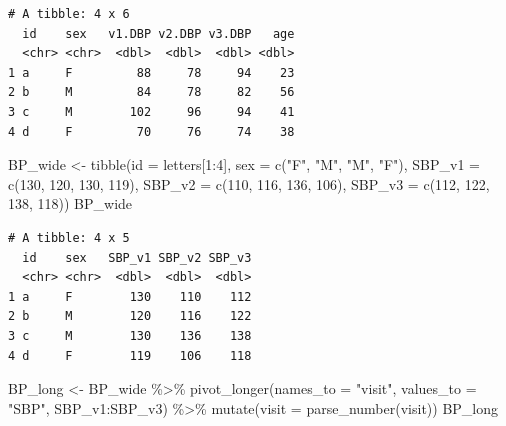 \documentclass[
]{book}
\newenvironment{Shaded}{\begin{snugshade}}{\end{snugshade}}
\newcommand{\AttributeTok}[1]{\textcolor[rgb]{0.77,0.63,0.00}{#1}}
\newcommand{\DecValTok}[1]{\textcolor[rgb]{0.00,0.00,0.81}{#1}}
\newcommand{\FunctionTok}[1]{\textcolor[rgb]{0.00,0.00,0.00}{#1}}
\newcommand{\NormalTok}[1]{#1}
\newcommand{\OtherTok}[1]{\textcolor[rgb]{0.56,0.35,0.01}{#1}}
\newcommand{\SpecialCharTok}[1]{\textcolor[rgb]{0.00,0.00,0.00}{#1}}
\newcommand{\StringTok}[1]{\textcolor[rgb]{0.31,0.60,0.02}{#1}}
\begin{document}
\begin{verbatim}
# A tibble: 4 x 6
  id    sex   v1.DBP v2.DBP v3.DBP   age
  <chr> <chr>  <dbl>  <dbl>  <dbl> <dbl>
1 a     F         88     78     94    23
2 b     M         84     78     82    56
3 c     M        102     96     94    41
4 d     F         70     76     74    38
\end{verbatim}

\begin{Shaded}
\begin{Highlighting}[]
\NormalTok{BP\_wide }\OtherTok{\textless{}{-}} \FunctionTok{tibble}\NormalTok{(}\AttributeTok{id =}\NormalTok{ letters[}\DecValTok{1}\SpecialCharTok{:}\DecValTok{4}\NormalTok{],}
                     \AttributeTok{sex =} \FunctionTok{c}\NormalTok{(}\StringTok{"F"}\NormalTok{, }\StringTok{"M"}\NormalTok{, }\StringTok{"M"}\NormalTok{, }\StringTok{"F"}\NormalTok{),}
                     \AttributeTok{SBP\_v1 =} \FunctionTok{c}\NormalTok{(}\DecValTok{130}\NormalTok{, }\DecValTok{120}\NormalTok{, }\DecValTok{130}\NormalTok{, }\DecValTok{119}\NormalTok{),}
                     \AttributeTok{SBP\_v2 =} \FunctionTok{c}\NormalTok{(}\DecValTok{110}\NormalTok{, }\DecValTok{116}\NormalTok{, }\DecValTok{136}\NormalTok{, }\DecValTok{106}\NormalTok{),}
                     \AttributeTok{SBP\_v3 =} \FunctionTok{c}\NormalTok{(}\DecValTok{112}\NormalTok{, }\DecValTok{122}\NormalTok{, }\DecValTok{138}\NormalTok{, }\DecValTok{118}\NormalTok{))}
\NormalTok{BP\_wide}
\end{Highlighting}
\end{Shaded}

\begin{verbatim}
# A tibble: 4 x 5
  id    sex   SBP_v1 SBP_v2 SBP_v3
  <chr> <chr>  <dbl>  <dbl>  <dbl>
1 a     F        130    110    112
2 b     M        120    116    122
3 c     M        130    136    138
4 d     F        119    106    118
\end{verbatim}

\begin{Shaded}
\begin{Highlighting}[]
\NormalTok{BP\_long }\OtherTok{\textless{}{-}}\NormalTok{ BP\_wide }\SpecialCharTok{\%\textgreater{}\%} 
  \FunctionTok{pivot\_longer}\NormalTok{(}\AttributeTok{names\_to =} \StringTok{"visit"}\NormalTok{, }\AttributeTok{values\_to =} \StringTok{"SBP"}\NormalTok{, SBP\_v1}\SpecialCharTok{:}\NormalTok{SBP\_v3) }\SpecialCharTok{\%\textgreater{}\%} 
  \FunctionTok{mutate}\NormalTok{(}\AttributeTok{visit =} \FunctionTok{parse\_number}\NormalTok{(visit))}
\NormalTok{BP\_long}
\end{Highlighting}
\end{Shaded}
\end{document}

